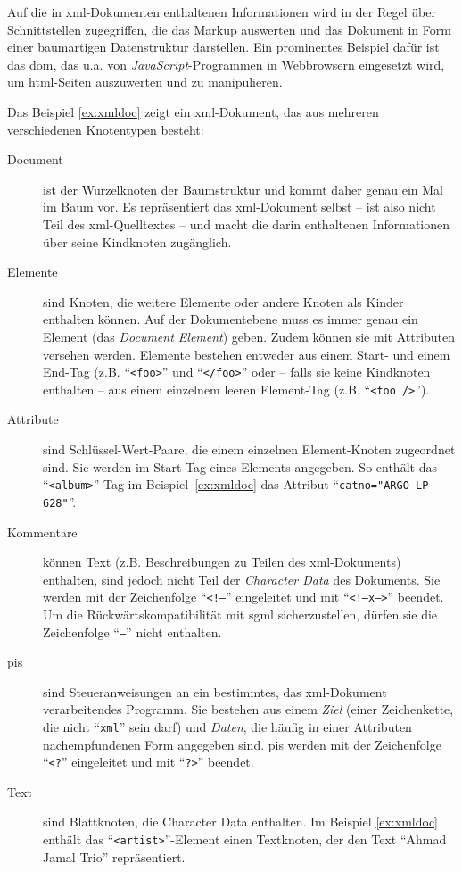 Auf die in \acrshort{xml}-Dokumenten enthaltenen Informationen wird in der Regel über Schnittstellen zugegriffen, die das Markup auswerten und das Dokument in Form einer baumartigen Datenstruktur darstellen. Ein prominentes Beispiel dafür ist das \acrfull{dom}, das u.a. von \emph{JavaScript}-Programmen in Webbrowsern eingesetzt wird, um  \acrshort{html}-Seiten auszuwerten und zu manipulieren.

Das Beispiel \ref{ex:xmldoc} zeigt ein \acrshort{xml}-Dokument, das aus mehreren verschiedenen Knotentypen besteht:

\begin{description}
    \item[Document] ist der Wurzelknoten der Baumstruktur und kommt daher genau ein Mal im Baum vor. Es repräsentiert das \acrshort{xml}-Dokument selbst -- ist also nicht Teil des \acrshort{xml}-Quelltextes -- und macht die darin enthaltenen Informationen über seine Kindknoten zugänglich.~\cite[Abschnitt 2.1]{xmlinfoset}
    \item[Elemente] sind Knoten, die weitere Elemente oder andere Knoten als Kinder enthalten können. Auf der Dokumentebene muss es immer genau ein Element (das \emph{Document Element}) geben. Zudem können sie mit Attributen versehen werden. Elemente bestehen entweder aus einem Start- und einem End-Tag (z.B. \enquote{\texttt{<foo>}} und \enquote{\texttt{</foo>}} oder -- falls sie keine Kindknoten enthalten -- aus einem einzelnem leeren Element-Tag (z.B. \enquote{\texttt{<foo />}}).
    \item[Attribute] sind Schlüssel-Wert-Paare, die einem einzelnen Element-Knoten zugeordnet sind. Sie werden im Start-Tag eines Elements angegeben. So enthält das \enquote{\texttt{<album>}}-Tag im Beispiel~\ref{ex:xmldoc} das Attribut \enquote{\texttt{catno="ARGO LP 628"}}.
    \item[Kommentare] können Text (z.B. Beschreibungen zu Teilen des \acrshort{xml}-Dokuments) enthalten, sind jedoch nicht Teil der \emph{Character Data} des Dokuments. Sie werden mit der Zeichenfolge \enquote{\texttt{<!--}} eingeleitet und mit \enquote{\texttt{<!--x-->}} beendet. Um die Rückwärtskompatibilität mit \acrshort{sgml} sicherzustellen, dürfen sie die Zeichenfolge \enquote{\texttt{--}} nicht enthalten.~\cite[Abschnitt 2.5]{xml}
    \item[\glspl{pi}] sind Steueranweisungen an ein bestimmtes, das \acrshort{xml}-Dokument verarbeitendes Programm. Sie bestehen aus einem \emph{Ziel} (einer Zeichenkette, die nicht \enquote{\texttt{xml}} sein darf) und \emph{Daten}, die häufig in einer Attributen nachempfundenen Form angegeben sind. \glspl{pi} werden mit der Zeichenfolge \enquote{\texttt{<?}} eingeleitet und mit \enquote{\texttt{?>}} beendet.~\cite[Abschnitt 2.6]{xml}
    \item[Text] sind Blattknoten, die Character Data enthalten. Im Beispiel \ref{ex:xmldoc} enthält das \linebreak{}\enquote{\texttt{<artist>}}-Element einen Textknoten, der den Text \enquote{Ahmad Jamal Trio} repräsentiert.
\end{description}

